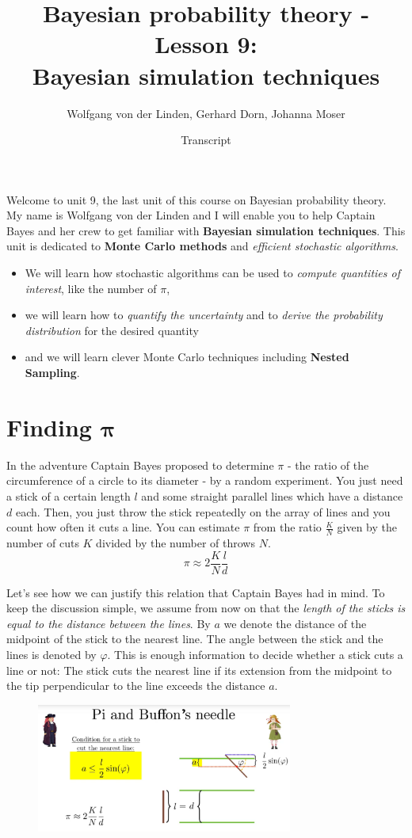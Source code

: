 \documentclass[12pt, a4paper]{scrartcl}
\title{Bayesian probability theory - Lesson 9:\\
Bayesian simulation techniques}
\author{Wolfgang von der Linden, Gerhard Dorn, Johanna Moser}
\date{Transcript}
\begin{document}
\setlength{\parindent}{0pt}
\maketitle
\onehalfspacing
Welcome to unit 9, the last unit of this course on Bayesian probability
theory. My name is Wolfgang von der Linden and I will enable you to
help Captain Bayes and her crew to get familiar with  \textbf{Bayesian simulation
techniques}.
This unit is dedicated to  \textbf{Monte Carlo methods} and  \textit{efficient stochastic algorithms}.\\
\begin{itemize}
\item We will learn how stochastic algorithms can be used to \textit{compute quantities of interest}, like the number of $\pi$,
\item we will learn how to \textit{quantify the uncertainty} and to \textit{derive the probability distribution} for the desired quantity
\item and we will learn clever Monte Carlo techniques including  \textbf{Nested Sampling}.
\end{itemize}

\section*{Finding $\mathbf{\pi}$}
In the adventure Captain Bayes proposed to determine $\pi$ - the ratio of the circumference of a circle to its diameter - by a random experiment. 
You just need a stick of a certain length $l$
and some straight parallel lines which have a distance $d$ each. Then, you just throw the stick repeatedly on the array of lines and you count how
often it cuts a line. You can estimate $\pi$ from the ratio $\frac KN$ given by the number of cuts $K$
divided by the number of throws $N$.\[\pi\approx 2\frac KN\frac ld\]

Let’s see how we can justify this relation that Captain Bayes had in mind.
To keep the discussion simple, we assume from now on that the \textit{length of the
sticks is equal to the distance between the lines}.
By $a$ we denote the distance of the midpoint of the stick to the nearest line.
The angle between the stick and the lines is denoted by $\varphi$. This is enough
information to decide whether a stick cuts a line or not: 
The stick cuts the nearest line if its extension from the midpoint to the tip
perpendicular to the line exceeds the distance $a$.\\%
 \begin{figure}[H]
	\centering
	\includegraphics[width=0.75\textwidth]{9_1.png}
\end{figure}
\end{document}
